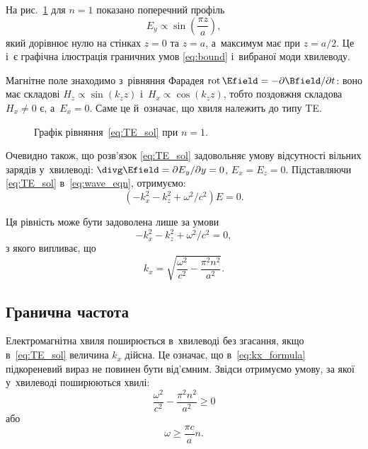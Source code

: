 На рис.~\ref{pic:TE_mode_profile} для $n=1$ показано поперечний профіль
\begin{equation}
E_y\propto \sin\!\left(\frac{\pi z}{a}\right),
\end{equation}
який дорівнює нулю на стінках $z=0$ та $z=a$, а~максимум має при $z=a/2$. Це і~є
графічна ілюстрація граничних умов \eqref{eq:bound} і~вибраної моди хвилеводу.

Магнітне поле знаходимо з~рівняння Фарадея $\operatorname{rot}\Efield=-\partial\Bfield/\partial t$: воно має складові $H_z\propto\sin(k_zz)$ і~$H_x\propto\cos(k_zz)$, тобто поздовжня складова $H_x\neq0$ є, а~$E_x=0$. Саме це й~означає, що хвиля належить до типу TE.


\begin{figure}[h!]\centering
	\caption{Графік рівняння~\eqref{eq:TE_sol} при $n=1$.}
	\label{pic:TE_mode_profile}
\end{figure}

Очевидно також, що розв'язок \eqref{eq:TE_sol} задовольняє умову відсутності вільних зарядів у~хвилеводі: $\divg\Efield = \partial E_y / \partial y = 0$, $E_x = E_z = 0$. Підставляючи \eqref{eq:TE_sol}  в~\eqref{eq:wave_eqn}, отримуємо:
\begin{equation}
	(-k_x^2 - k_z^2 + \omega^2/c^2) E = 0.
\end{equation}

Ця рівність може бути задоволена лише за умови
\begin{equation}
	-k_x^2 - k_z^2 + \omega^2/c^2 = 0,
\end{equation}
з якого випливає, що
\begin{equation}\label{eq:kx_formula}
	k_x = \sqrt{\frac{\omega^2}{c^2} - \frac{\pi^2 n^2}{a^2}}.
\end{equation}



\subsection*{Гранична частота}


Електромагнітна хвиля поширюється в~хвилеводі без згасання, якщо в~\eqref{eq:TE_sol} величина $k_x$ дійсна. Це означає, що в~\eqref{eq:kx_formula} підкореневий вираз не повинен бути від'ємним. Звідси отримуємо умову, за якої у~хвилеводі поширюються хвилі:
\begin{equation}
	\frac{\omega^2}{c^2} - \frac{\pi^2 n^2}{a^2} \geqslant 0
	\label{eq:propagation_condition}
\end{equation}
або
\begin{equation}
	\omega \geqslant \frac{\pi c}{a} n.
	\label{eq:cutoff_frequency_ineq}
\end{equation}

